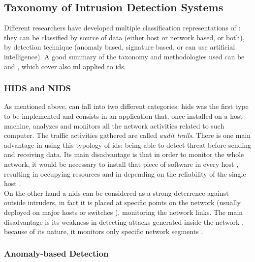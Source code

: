 

\subsection{Taxonomy of Intrusion Detection Systems}
\label{subsec:taxonomy-ids}

Different researchers have developed multiple classification representations of : they can be classified by source of data (either host or network based, or both), by detection technique (anomaly based, signature based, or can use artificial intelligence). A good summary of the taxonomy and methodologies used can be \cite{Hodo2017} and \cite{Liu2019}, which cover also \gls{ml} applied to \gls{ids}.

\subsubsection{HIDS and NIDS}
\label{subsubsec:hids-nids}

As mentioned above,  can fall into two different categories: \gls{hids} was the first type to be implemented \cite{Debar1999} and consists in an application that, once installed on a host machine, analyzes and monitors all the network activities related to such computer. The traffic activities gathered are called \textit{audit trails}. There is one main advantage in using this typology of \gls{ids}: being able to detect threat before sending and receiving data. Its main disadvantage is that in order to monitor the whole network, it would be necessary to install that piece of software in every host \cite{Hodo2017}, resulting in occupying resources and in depending on the reliability of the single host \cite{Liu2019}. \\ On the other hand a \gls{nids} can be considered as a strong deterrence against outside intruders, in fact it is placed at specific points on the network (usually deployed on major hosts or switches \cite{Liu2019}), monitoring the network links. The main disadvantage is its weakness in detecting attacks generated inside the network \cite{Hodo2017}, because of its nature, it monitors only specific network segments \cite{Liu2019}.

\subsubsection{Anomaly-based Detection}
\label{subsubsec:anomaly-detection}

